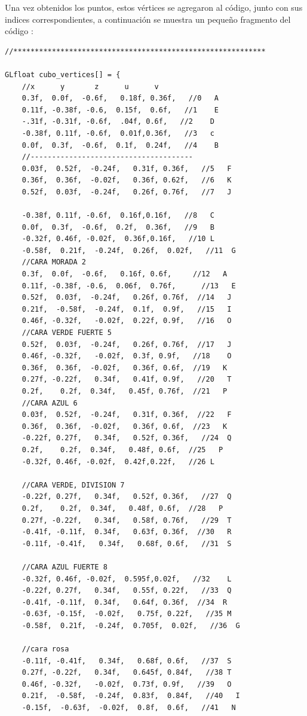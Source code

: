 \documentclass[12pt, a4paper]{article}
\begin{document}
 \raggedright 	
\justify
Una vez obtenidos los puntos, estos vértices se agregaron al código, junto con sus indices correspondientes, a continuación se muestra un pequeño fragmento del código :
\begin{verbatim}
//***********************************************************

GLfloat cubo_vertices[] = {
	//x      y       z      u	   v
	0.3f,  0.0f,  -0.6f,   0.18f, 0.36f,   //0   A
	0.11f, -0.38f, -0.6,  0.15f,  0.6f,   //1    E
	-.31f, -0.31f, -0.6f,  .04f, 0.6f,   //2    D
	-0.38f, 0.11f, -0.6f,  0.01f,0.36f,   //3	c
	0.0f,  0.3f,  -0.6f,  0.1f,	 0.24f,   //4    B
	//--------------------------------------
	0.03f,  0.52f,  -0.24f,   0.31f, 0.36f,   //5   F
	0.36f,  0.36f,  -0.02f,   0.36f, 0.62f,   //6   K
	0.52f,  0.03f,  -0.24f,   0.26f, 0.76f,   //7   J

	-0.38f, 0.11f, -0.6f,  0.16f,0.16f,   //8	C
	0.0f,  0.3f,  -0.6f,  0.2f,  0.36f,   //9   B
	-0.32f, 0.46f, -0.02f,  0.36f,0.16f,   //10	L
	-0.58f,  0.21f,  -0.24f,  0.26f,  0.02f,   //11  G
	//CARA MORADA 2
	0.3f,  0.0f,  -0.6f,   0.16f, 0.6f,     //12   A
	0.11f, -0.38f, -0.6,  0.06f,  0.76f,      //13   E
	0.52f,  0.03f,  -0.24f,   0.26f, 0.76f,  //14   J
	0.21f,  -0.58f,  -0.24f,  0.1f,  0.9f,   //15   I
	0.46f, -0.32f,   -0.02f,  0.22f, 0.9f,   //16	O
	//CARA VERDE FUERTE 5
	0.52f,  0.03f,  -0.24f,   0.26f, 0.76f,  //17   J
	0.46f, -0.32f,   -0.02f,  0.3f, 0.9f,   //18	O
	0.36f,  0.36f,  -0.02f,   0.36f, 0.6f,  //19   K
	0.27f, -0.22f,   0.34f,   0.41f, 0.9f,   //20	T
	0.2f,    0.2f,  0.34f,   0.45f, 0.76f,  //21   P
	//CARA AZUL 6
	0.03f,  0.52f,  -0.24f,   0.31f, 0.36f,  //22   F
	0.36f,  0.36f,  -0.02f,   0.36f, 0.6f,  //23   K
	-0.22f, 0.27f,   0.34f,   0.52f, 0.36f,   //24	Q
	0.2f,    0.2f,  0.34f,   0.48f, 0.6f,  //25   P
	-0.32f, 0.46f, -0.02f,  0.42f,0.22f,   //26	L

	//CARA VERDE, DIVISION 7
	-0.22f, 0.27f,   0.34f,   0.52f, 0.36f,   //27	Q
	0.2f,    0.2f,  0.34f,   0.48f, 0.6f,  //28   P
	0.27f, -0.22f,   0.34f,   0.58f, 0.76f,   //29	T
	-0.41f, -0.11f,  0.34f,   0.63f, 0.36f,  //30   R
	-0.11f, -0.41f,   0.34f,   0.68f, 0.6f,   //31	S

	//CARA AZUL FUERTE 8
	-0.32f, 0.46f, -0.02f,  0.595f,0.02f,   //32	L
	-0.22f, 0.27f,   0.34f,   0.55f, 0.22f,   //33	Q
	-0.41f, -0.11f,  0.34f,   0.64f, 0.36f,  //34  R
	-0.63f, -0.15f,  -0.02f,   0.75f, 0.22f,   //35	M
	-0.58f,  0.21f,  -0.24f,  0.705f,  0.02f,   //36  G
	
	//cara rosa
	-0.11f, -0.41f,   0.34f,   0.68f, 0.6f,   //37	S
	0.27f, -0.22f,   0.34f,   0.645f, 0.84f,   //38	T
	0.46f, -0.32f,   -0.02f,  0.73f, 0.9f,   //39	O
	0.21f,  -0.58f,  -0.24f,  0.83f,  0.84f,   //40   I
	-0.15f,  -0.63f,  -0.02f,  0.8f,  0.6f,   //41   N


\end{verbatim}
\end{document}
